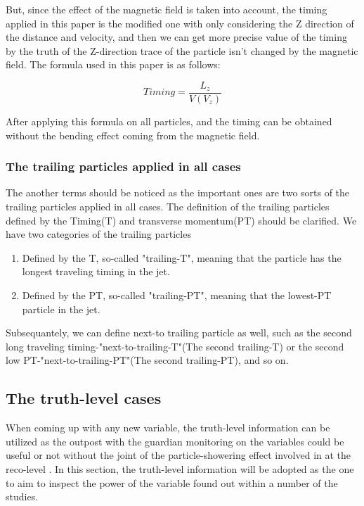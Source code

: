 But, since the effect of the magnetic field is taken into account, the timing applied in this paper is the modified one with only considering the Z direction of the distance and velocity, and then we can get more precise value of the timing by the truth of the Z-direction trace of the particle isn't changed by the magnetic field. The formula used in this paper is as follows: 

\begin{equation}
 Timing = \frac{L_{z}}{V(V_{z})} 
\end{equation}

After applying this formula on all particles, and the timing can be obtained without the bending effect coming from the magnetic field.\\ 

\subsubsection{The trailing particles applied in all cases}
The another terms should be noticed as the important ones are two sorts of the trailing particles applied in all cases. The definition of the trailing particles defined by the Timing(T) and transverse momentum(PT) should be clarified. We have two categories of the trailing particles
\begin{enumerate}
\item Defined by the T, so-called "trailing-T", meaning that the particle has the longest traveling timing in the jet. 
\item Defined by the PT, so-called "trailing-PT", meaning that the lowest-PT particle in the jet. 
\end{enumerate}

Subsequantely, we can define next-to trailing particle as well, such as the second long traveling timing-"next-to-trailing-T"(The second trailing-T) or the second low PT-"next-to-trailing-PT"(The second trailing-PT), and so on.

\subsection{The truth-level cases}
When coming up with any new variable, the truth-level information can be utilized as the outpost with the guardian monitoring on the variables could be useful or not without the joint of the particle-showering effect involved in at the reco-level . In this section, the truth-level information will be adopted as the one to aim to inspect the power of the variable found out within a number of the studies.\\


